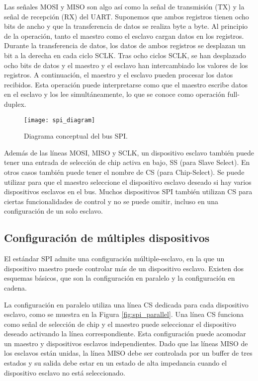     Las señales MOSI y MISO son algo así como la señal de transmisión (TX) y la señal de recepción (RX) del UART. Suponemos que ambos registros tienen ocho bits de ancho y que la transferencia de datos se realiza byte a byte. Al principio de la operación, tanto el maestro como el esclavo cargan datos en los registros. Durante la transferencia de datos, los datos de ambos registros se desplazan un bit a la derecha en cada ciclo SCLK. Tras ocho ciclos SCLK, se han desplazado ocho bits de datos y el maestro y el esclavo han intercambiado los valores de los registros. A continuación, el maestro y el esclavo pueden procesar los datos recibidos. Esta operación puede interpretarse como que el maestro escribe datos en el esclavo y los lee simultáneamente, lo que se conoce como operación full-duplex.

    \begin{figure}[hbtp]
        \centering
        \texttt{[image: spi\_diagram]}
        \caption{Diagrama conceptual del bus SPI.}
        \label{fig:spi_diagram}
    \end{figure}    

    Además de las líneas MOSI, MISO y SCLK, un dispositivo esclavo también puede tener una entrada de selección de chip activa en bajo, SS (para Slave Select). En otros casos también puede tener el nombre de  CS (para Chip-Select). Se puede utilizar para que el maestro seleccione el dispositivo esclavo deseado si hay varios dispositivos esclavos en el bus. Muchos dispositivos SPI también utilizan CS para ciertas funcionalidades de control y no se puede omitir, incluso en una configuración de un solo esclavo.

    \subsection{Configuración de múltiples dispositivos}

    El estándar SPI admite una configuración múltiple-esclavo, en la que un dispositivo maestro puede controlar más de un dispositivo esclavo. Existen dos esquemas básicos, que son la configuración en paralelo y la configuración en cadena.

    La configuración en paralelo utiliza una línea CS dedicada para cada dispositivo esclavo, como se muestra en la Figura \ref{fig:spi_parallel}. Una línea CS funciona como señal de selección de chip y el maestro puede seleccionar el dispositivo deseado activando la línea correspondiente. Esta configuración puede acomodar un maestro y dispositivos esclavos independientes. Dado que las líneas MISO de los esclavos están unidas, la línea MISO debe ser controlada por un buffer de tres estados y su salida debe estar en un estado de alta impedancia cuando el dispositivo esclavo no está seleccionado. 

